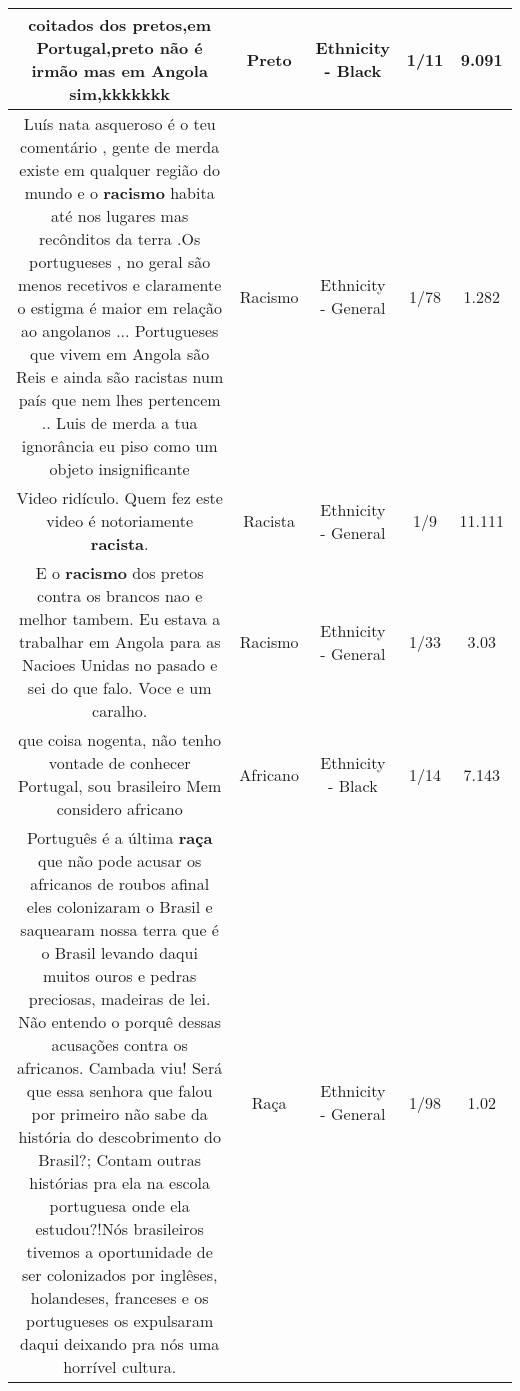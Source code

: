 \documentclass[11pt]{article}
\newlength\mylength
\begin{document}
\begin{center}
\begin{longtable}{|C{.65\mylength}|C{.30\mylength}|C{.12\mylength}|C{.12\mylength}|C{.12\mylength}|}
  \small coitados dos pretos,em Portugal,\textbf{preto} não é irmão mas em Angola sim,kkkkkkk\normalsize   & Preto & Ethnicity - Black & 1/11 & 9.091 \\  \hline
  \small Luís nata asqueroso é o teu comentário , gente de merda existe em qualquer região do mundo e o \textbf{racismo} habita até nos lugares mas recônditos da terra .Os portugueses , no geral são menos recetivos e claramente o estigma é maior em relação ao angolanos ... Portugueses que vivem em Angola são Reis e ainda são racistas num país que nem lhes pertencem .. Luis de merda a tua ignorância eu piso como um objeto insignificante\normalsize   & Racismo & Ethnicity - General & 1/78 & 1.282 \\  \hline
  \small Video ridículo. Quem fez este video é notoriamente \textbf{racista}.\normalsize   & Racista & Ethnicity - General & 1/9 & 11.111 \\  \hline
  \small E o \textbf{racismo} dos pretos contra os brancos nao e melhor tambem. Eu estava a trabalhar em Angola para as Nacioes Unidas no pasado e sei do que falo. Voce e um caralho.\normalsize   & Racismo & Ethnicity - General & 1/33 & 3.03 \\  \hline
  \small que coisa nogenta, não tenho vontade de conhecer Portugal, sou brasileiro Mem considero africano\normalsize   & Africano & Ethnicity - Black & 1/14 & 7.143 \\  \hline
  \small Português é a última \textbf{raça} que não pode acusar os africanos de roubos afinal eles colonizaram o Brasil e saquearam nossa terra que é o Brasil levando daqui muitos ouros e pedras preciosas, madeiras de lei. Não entendo o porquê dessas acusações contra os africanos. Cambada viu! Será que essa senhora que falou por primeiro não sabe da história do descobrimento do Brasil?; Contam outras histórias pra ela na escola portuguesa onde ela estudou?!Nós brasileiros tivemos a oportunidade de ser colonizados por inglêses, holandeses, franceses e os portugueses os expulsaram daqui deixando pra nós uma horrível cultura.\normalsize   & Raça & Ethnicity - General & 1/98 & 1.02 \\  \hline

\end{longtable}
\end{center}
\end{document}
